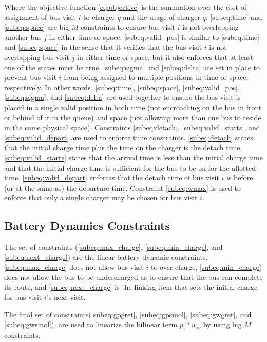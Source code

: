\documentclass[letterpaper, 10pt, conference]{IEEEtran}
\begin{document}
Where the objective function \eqref{eq:objective} is the summation over the cost of assignment of bus visit \(i\) to charger \(q\) and the usage of charger \(q\). \eqref{subeq:time} and \eqref{subeq:space} are big \(M\) constraints to ensure bus visit \(i\) is not overlapping another bus \(j\) in either time or space. \eqref{subeq:valid_pos} is similar to \eqref{subeq:time} and \eqref{subeq:space} in the sense that it verifies that the bus visit \(i\) is not overlapping bus visit \(j\) in either time or space, but it also enforces that at least one of the states must be true. \eqref{subeq:sigma} and \eqref{subeq:delta} are set in place to prevent bus visit \(i\) from being assigned to multiple positions in time or space, respectively. In other words, \eqref{subeq:time}, \eqref{subeq:space}, \eqref{subeq:valid_pos}, \eqref{subeq:sigma}, and \eqref{subeq:delta} are used together to ensure the bus visit is placed in a single valid position in both time (not encroaching on the bus in front or behind of it in the queue) and space (not allowing more than one bus to reside in the same physical space).
 Constraints \eqref{subeq:detach}, \eqref{subeq:valid_starts}, and \eqref{subeq:valid_depart} are used to enforce time constraints. \eqref{subeq:detach} states that the initial charge time plus the time on the charger is the detach time. \eqref{subeq:valid_starts} states that the arrival time is less than the initial charge time and that the initial charge time is sufficient for the bus to be on for the allotted time. \eqref{subeq:valid_depart} enforces that the detach time of bus visit \(i\) is before (or at the same as) the departure time. Constraint \eqref{subeq:wmax} is used to enforce that only a single charger may be chosen for bus visit \(i\).

\subsection{Battery Dynamics Constraints}
The set of constraints (\eqref{subeq:max_charge}, \eqref{subeq:min_charge}, and \eqref{subeq:next_charge}) are the linear battery dynamic constraints. \eqref{subeq:max_charge} does not allow bus visit \(i\) to over charge, \eqref{subeq:min_charge} does not allow the bus to be undercharged as to ensure that the bus can complete its route, and \eqref{subeq:next_charge} is the linking item that sets the initial charge for bus visit \(i\)'s next visit.

The final set of constraints(\eqref{subeq:gpgret}, \eqref{subeq:gpsmol}, \eqref{subeq:gwgret}, and \eqref{subeq:gwsmol}), are used to linearize the bilinear term \(p_i*w_{iq}\) by using big \(M\) constraints.
\end{document}

